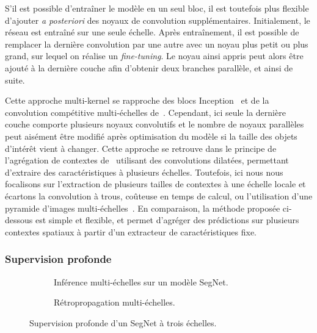 S'il est possible d'entraîner le modèle en un seul bloc, il est toutefois plus flexible d'ajouter \emph{a posteriori} des noyaux de convolution supplémentaires. Initialement, le réseau est entraîné sur une seule échelle. Après entraînement, il est possible de remplacer la dernière convolution par une autre avec un noyau plus petit ou plus grand, sur lequel on réalise un \emph{fine-tuning}. Le noyau ainsi appris peut alors être ajouté à la dernière couche afin d'obtenir deux branches parallèle, et ainsi de suite.

Cette approche multi-kernel se rapproche des blocs Inception~\cite{szegedy_going_2015} et de la convolution compétitive multi-échelles de~\citet{liao_competitive_2015}. Cependant, ici seule la dernière couche comporte plusieurs noyaux convolutifs et le nombre de noyaux parallèles peut aisément être modifié après optimisation du modèle si la taille des objets d'intérêt vient à changer. Cette approche se retrouve dans le principe de l'agrégation de contextes de~\citet{yu_multi-scale_2015} utilisant des convolutions dilatées, permettant d'extraire des caractéristiques à plusieurs échelles. Toutefois, ici nous nous focalisons sur l'extraction de plusieurs tailles de contextes à une échelle locale et écartons la convolution à trous, coûteuse en temps de calcul, ou l'utilisation d'une pyramide d'images multi-échelles~\cite{zhao_learning_2016}. En comparaison, la méthode proposée ci-dessous est simple et flexible, et permet d'agréger des prédictions sur plusieurs contextes spatiaux à partir d'un extracteur de caractéristiques fixe.

\subsubsection{Supervision profonde}
\label{sec:deep_multiscale}

\begin{figure}
	  \begin{subfigure}[t]{0.50\textwidth}
		\resizebox{\textwidth}{!}{}
        \caption{Inférence multi-échelles sur un modèle SegNet.}
    \end{subfigure}
    \begin{subfigure}[t]{0.50\textwidth}
		\resizebox{\textwidth}{!}{}
        \caption{Rétropropagation multi-échelles.}
    \end{subfigure}
    \caption{Supervision profonde d'un SegNet à trois échelles.}
    \label{fig:ms_deep_segnet}
\end{figure}

